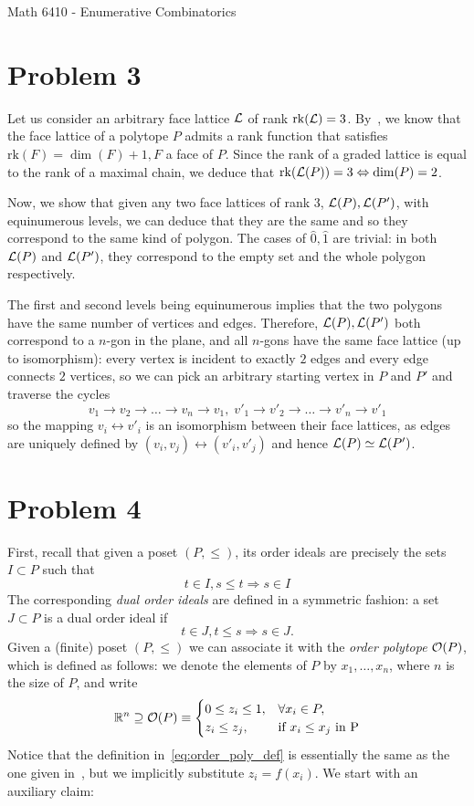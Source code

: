 \documentclass[11pt]{article}
\begin{document}
\allowdisplaybreaks

%
{Math 6410 - Enumerative Combinatorics}

\section*{Problem 3}
Let us consider an arbitrary face lattice $\mathcal{L}$ of rank $\mathrm{rk}(\mathcal{L}) = 3$.
By~\cite[Theorem 2.7]{Zieg95}, we know that the face lattice of a polytope $P$
admits a rank function that satisfies $\mathrm{rk}(F) = \dim(F) + 1, F$ a face
of $P$. Since the rank of a graded lattice is equal to the rank of a maximal
chain, we deduce that $\mathrm{rk}(\mathcal{L}(P)) = 3 \Leftrightarrow \dim(P) = 2$.

Now, we show that given any two face lattices of rank $3$, $\mathcal{L}(P), \mathcal{L}(P')$,
with equinumerous levels, we can deduce that they are the same and so they
correspond to the same kind of polygon. The cases of $\hat{0}, \hat{1}$ are
trivial: in both $\mathcal{L}(P)$ and $\mathcal{L}(P')$, they correspond to the empty set and
the whole polygon respectively.

The first and second levels being equinumerous implies that the two polygons
have the same number of vertices and edges.  Therefore, $\mathcal{L}(P), \mathcal{L}(P')$ both
correspond to a $n$-gon in the plane, and all $n$-gons have the same face
lattice (up to isomorphism): every vertex is incident to exactly $2$ edges and
every edge connects $2$ vertices, so we can pick an arbitrary starting vertex
in $P$ and $P'$ and traverse the cycles
\[
    v_1 \to v_2 \to \dots \to v_n \to v_1, \;
    v'_1 \to v'_2 \to \dots \to v'_n \to v'_1
\]
so the mapping $v_i \leftrightarrow v'_i$ is an isomorphism between their face
lattices, as edges are uniquely defined by $(v_i, v_j) \leftrightarrow (v'_i,
v'_j)$ and hence $\mathcal{L}(P) \simeq \mathcal{L}(P')$.

\section*{Problem 4}
First, recall that given a poset $(P, \leq)$, its order ideals are precisely
the sets $I \subset P$ such that
\[
    t \in I, s \leq t \Rightarrow s \in I
\]
The corresponding \textit{dual order ideals} are defined in a symmetric fashion:
a set $J \subset P$ is a dual order ideal if
\[
    t \in J, t \leq s \Rightarrow s \in J.
\]
Given a (finite) poset $(P, \leq)$ we can associate it with the \textit{order
polytope} $\mathcal{O}(P)$, which is defined as follows: we denote the elements of $P$
by $x_1, \dots, x_n$, where $n$ is the size of $P$, and write
\begin{equation}
    \mathbb{R}^n \supseteq \mathcal{O}(P) \equiv \begin{cases}
        0 \leq z_i \leq 1, & \forall x_i \in P, \\
        z_i \leq z_j, & \text{if } x_i \leq x_j \text{ in P}
    \end{cases}
    \label{eq:order_poly_def}
\end{equation}
Notice that the definition in~\cref{eq:order_poly_def} is essentially the same
as the one given in~\cite{Stan86}, but we implicitly substitute $z_i = f(x_i)$.
We start with an auxiliary claim:
\end{document}
